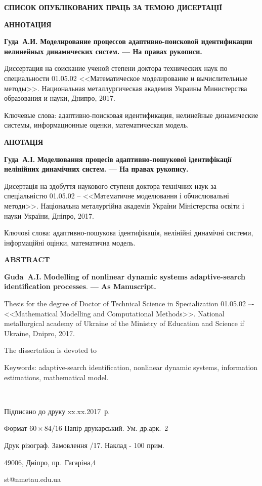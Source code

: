 \documentclass[a4paper,12pt]{atuaref}
\newcommand{\xsect}[1]{\medskip\begin{center}\textbf{#1}\end{center}\medskip\penalty10000}
\begin{document}
\xsect{СПИСОК ОПУБЛІКОВАНИХ ПРАЦЬ ЗА ТЕМОЮ ДИСЕРТАЦІЇ}

\nocite{*}

\printbibliography




\xsect{АННОТАЦИЯ}

\textbf{Гуда~А.И.}
\textbf{Моделирование процессов адаптивно-поисковой идентификации нелинейных динамических систем.}
\textbf{--- На правах рукописи.}

Диссертация на соискание ученой степени доктора технических
наук по специальности 01.05.02
<<Математическое моделирование и вычислительные методы>>.
Национальная металлургическая академия Украины Министерства образования и науки, Днипро, 2017.


Ключевые слова:
адаптивно-поисковая идентификация, нелинейные динамические системы,
информационные оценки, математическая модель.


\xsect{АНОТАЦІЯ}

\textbf{Гуда~А.І.}
\textbf{Моделювання процесів адаптивно-пошукової ідентифікації нелінійних динамічних систем.}
\textbf{--- На правах рукопису.}

Дисертація на здобуття наукового ступеня доктора технічних наук
за спеціальністю 01.05.02 --
<<Математичне моделювання і обчислювальні методи>>.
Національна металургійна академія України
Міністерства освіти і науки України, Дніпро, 2017.


Ключові слова: адаптивно-пошукова ідентифікація, нелінійні динамічні
системи, інформаційні оцінки, математична модель.



\xsect{ABSTRACT}

\textbf{Guda~A.I.}
\textbf{Modelling of nonlinear dynamic systems adaptive-search identification processes}.
\textbf{--- As Manuscript.}

Thesis for the degree of Doctor of Technical Science in Specialization 01.05.02 –-
<<Mathematical Modelling and Computational Methods>>.
National metallurgical academy of Ukraine  of the Ministry of Education and Science if Ukraine, Dnipro, 2017.

The dissertation is devoted to

Keywords: adaptive-search identification, nonlinear dynamic systems,
information estimations, mathematical model.

\clearpage

{~}
\vfill

\begin{center}


Підписано до друку xx.xx.2017~р.

Формат $60 \times 84/16$  Папір друкарський. Ум. др.арк.~2

Друк різограф. Замовлення /17. Наклад - 100 прим.


49006, Дніпро, пр.~Гагаріна,4

st@nmetau.edu.ua

\end{center}

\vfill
\end{document}
